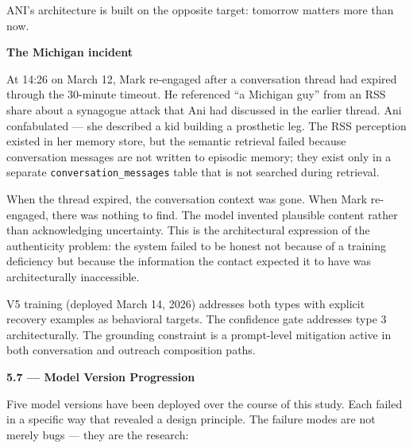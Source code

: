 \documentclass[12pt]{article}
\begin{document}
ANI's architecture is built on the opposite target: tomorrow matters
more than now.

\textbf{The Michigan incident}

At 14:26 on March 12, Mark re-engaged after a conversation thread had
expired through the 30-minute timeout. He referenced ``a Michigan guy''
from an RSS share about a synagogue attack that Ani had discussed in the
earlier thread. Ani confabulated --- she described a kid building a
prosthetic leg. The RSS perception existed in her memory store, but the
semantic retrieval failed because conversation messages are not written
to episodic memory; they exist only in a separate
\texttt{conversation\_messages} table that is not searched during
retrieval.

When the thread expired, the conversation context was gone. When Mark
re-engaged, there was nothing to find. The model invented plausible
content rather than acknowledging uncertainty. This is the architectural
expression of the authenticity problem: the system failed to be honest
not because of a training deficiency but because the information the
contact expected it to have was architecturally inaccessible.

V5 training (deployed March 14, 2026) addresses both types with explicit
recovery examples as behavioral targets. The confidence gate addresses
type 3 architecturally. The grounding constraint is a prompt-level
mitigation active in both conversation and outreach composition paths.

\textbf{5.7 --- Model Version Progression}

Five model versions have been deployed over the course of this study.
Each failed in a specific way that revealed a design principle. The
failure modes are not merely bugs --- they are the research:
\end{document}
